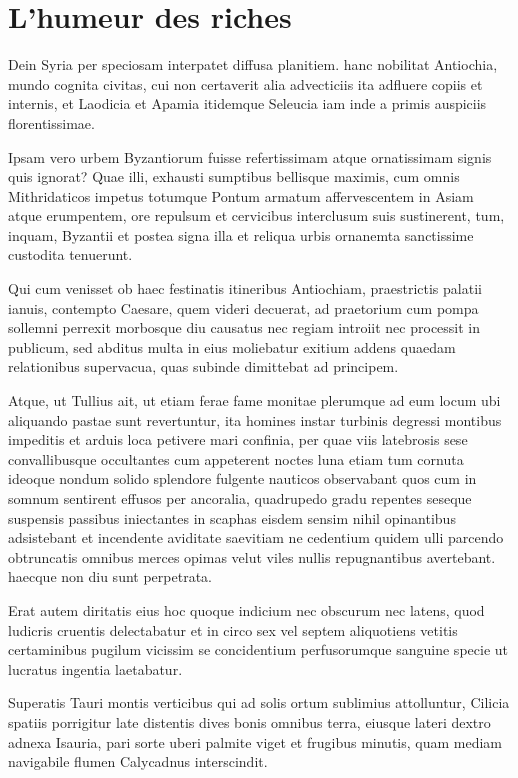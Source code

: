 
\section{L'humeur des riches}

Dein Syria per speciosam interpatet diffusa planitiem. hanc nobilitat Antiochia, mundo cognita civitas, cui non certaverit alia 
advecticiis ita adfluere copiis et internis, et Laodicia et Apamia itidemque Seleucia iam inde a primis auspiciis florentissimae.

Ipsam vero urbem Byzantiorum fuisse refertissimam atque ornatissimam signis quis ignorat? Quae illi, exhausti sumptibus bellisque 
maximis, cum omnis Mithridaticos impetus totumque Pontum armatum affervescentem in Asiam atque erumpentem, ore repulsum 
et cervicibus interclusum suis sustinerent, tum, inquam, Byzantii et postea signa illa et reliqua urbis ornanemta sanctissime 
custodita tenuerunt.

Qui cum venisset ob haec festinatis itineribus Antiochiam, praestrictis palatii ianuis, contempto Caesare, quem videri decuerat, ad 
praetorium cum pompa sollemni perrexit morbosque diu causatus nec regiam introiit nec processit in publicum, sed abditus multa in 
eius moliebatur exitium addens quaedam relationibus supervacua, quas subinde dimittebat ad principem.

Atque, ut Tullius ait, ut etiam ferae fame monitae plerumque ad eum locum ubi aliquando pastae sunt revertuntur, ita homines 
instar turbinis degressi montibus impeditis et arduis loca petivere mari confinia, per quae viis latebrosis sese convallibusque 
occultantes cum appeterent noctes luna etiam tum cornuta ideoque nondum solido splendore fulgente nauticos observabant quos 
cum in somnum sentirent effusos per ancoralia, quadrupedo gradu repentes seseque suspensis passibus iniectantes in scaphas 
eisdem sensim nihil opinantibus adsistebant et incendente aviditate saevitiam ne cedentium quidem ulli parcendo obtruncatis 
omnibus merces opimas velut viles nullis repugnantibus avertebant. haecque non diu sunt perpetrata.

Erat autem diritatis eius hoc quoque indicium nec obscurum nec latens, quod ludicris cruentis delectabatur et in circo sex vel 
septem aliquotiens vetitis certaminibus pugilum vicissim se concidentium perfusorumque sanguine specie ut lucratus ingentia 
laetabatur.

Superatis Tauri montis verticibus qui ad solis ortum sublimius attolluntur, Cilicia spatiis porrigitur late distentis dives bonis omnibus 
terra, eiusque lateri dextro adnexa Isauria, pari sorte uberi palmite viget et frugibus minutis, quam mediam navigabile flumen 
Calycadnus interscindit.

